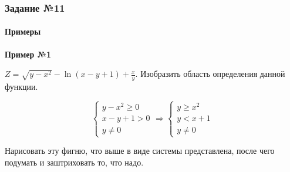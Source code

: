 \documentclass{article}
\begin{document}
\subsubsection{Задание №11}

\paragraph{Примеры}

\textbf{Пример №1}

$Z = \sqrt{y - x^2} - \ln (x - y + 1) + \frac{x}{y}$. Изобразить область определения данной функции.

\begin{equation}
	\begin{cases}
		y - x^2 \ge 0 \\
		x - y + 1 > 0 \\
		y \ne 0
	\end{cases} \Longrightarrow
	\begin{cases}
		y \ge x^2 \\
		y < x + 1 \\
		y \ne 0
	\end{cases}
\end{equation}

Нарисовать эту фигню, что выше в виде системы представлена, после чего подумать и заштриховать то, что надо.
\end{document}
